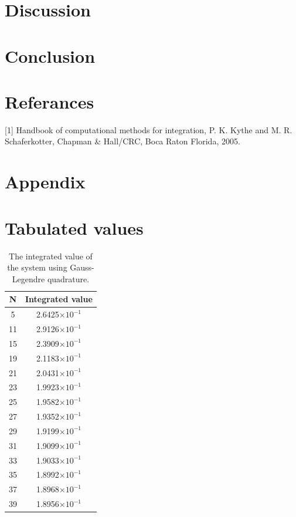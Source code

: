 \documentclass[%
reprint,
amsmath,amssymb,
aps,
]{revtex4-1}
\begin{document}
\newpage 
\section{Discussion}
\section{Conclusion }

\newpage 
\onecolumngrid
\section{Referances}
[1] Handbook of computational methods for integration, P. K. Kythe and M. R. Schaferkotter, Chapman \& Hall/CRC, Boca Raton Florida, 2005.

\section{Appendix}
\section{Tabulated values}

\begin{table}[!h]
	\begin{tabular}{|c|c|}
		\hline 
		\hspace{5mm} \textbf{N} \hspace{5mm} & \textbf{Integrated value}\\
		\hline 
		5              &        2.6425$\times 10^{-1}$             \\
		11             &        2.9126$\times 10^{-1}$               \\
		15             &        2.3909$\times 10^{-1}$               \\
		19             &        2.1183$\times 10^{-1}$               \\
		21             &        2.0431$\times 10^{-1}$               \\
		23             &        1.9923$\times 10^{-1}$               \\
		25             &        1.9582$\times 10^{-1}$               \\
		27             &        1.9352$\times 10^{-1}$               \\
		29             &        1.9199$\times 10^{-1}$               \\
		31             &        1.9099$\times 10^{-1}$               \\
		33             &        1.9033$\times 10^{-1}$               \\
		35             &        1.8992$\times 10^{-1}$               \\
		37             &        1.8968$\times 10^{-1}$               \\
		39             &        1.8956$\times 10^{-1}$               \\ \hline 
	\end{tabular}
	\caption{\label{legendre_values} The integrated value of the system using Gauss-Legendre quadrature.}
\end{table}
\end{document}
